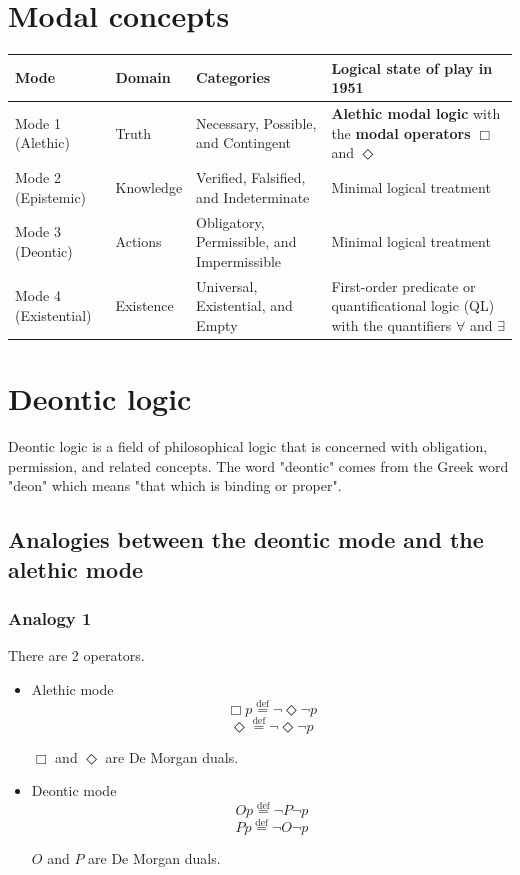 \documentclass[11pt]{article}
\newcommand{\defequal}{\stackrel{\scriptscriptstyle\mathrm{def}}{=}}
\begin{document}
 \newpage
\section{Modal concepts}
\label{sec:org27151dd}
\begin{center}
\begin{tabularx}{1.2\textwidth}{|X|X|X|X|}
\hline
Mode & Domain & Categories & Logical state of play in 1951\\
\hline
Mode 1 (Alethic) & Truth & Necessary, Possible, and Contingent & \textbf{Alethic modal logic} with the \textbf{modal operators} \(\Box\) and \(\Diamond\)\\
\hline
Mode 2 (Epistemic) & Knowledge & Verified, Falsified, and Indeterminate & Minimal logical treatment\\
\hline
Mode 3 (Deontic) & Actions & Obligatory, Permissible, and Impermissible & Minimal logical treatment\\
\hline
Mode 4 (Existential) & Existence & Universal, Existential, and Empty & First-order predicate or quantificational logic (QL) with the quantifiers \(\forall\) and \(\exists\)\\
\hline
\end{tabularx}
\end{center}

 \newpage
\section{Deontic logic}
\label{sec:orgdf0beb3}
Deontic logic is a field of philosophical logic that is concerned with obligation, permission, and related concepts. The word "deontic" comes from the Greek word "deon" which means "that which is binding or proper".
\subsection{Analogies between the deontic mode and the alethic mode}
\label{sec:org9b38748}

\subsubsection{Analogy 1}
\label{sec:org130035c}
There are 2 operators.
\begin{itemize}
\item Alethic mode
\[\Box p \defequal \neg \Diamond \neg p\]
\[\Diamond \defequal \neg \Diamond \neg p\]

\(\Box\) and \(\Diamond\) are De Morgan duals.

\item Deontic mode
\[Op \defequal \neg P \neg p\]
\[Pp \defequal \neg O \neg p\]

\(O\) and \(P\) are De Morgan duals.
\end{itemize}
\end{document}
